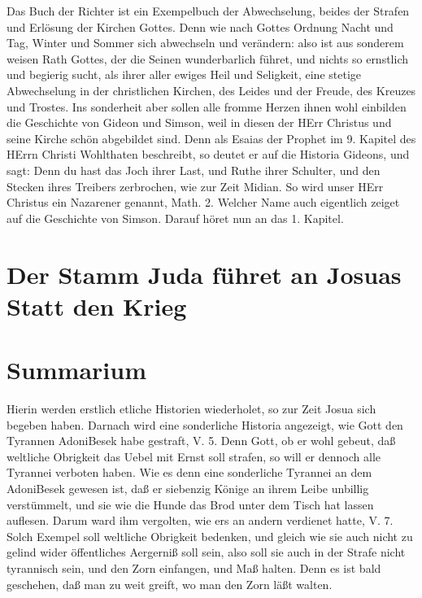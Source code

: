 Das Buch der Richter ist ein Exempelbuch der Abwechselung, beides der Strafen und Erlösung der Kirchen Gottes. Denn wie nach Gottes Ordnung Nacht und Tag, Winter und Sommer sich abwechseln und verändern: also ist aus sonderem weisen Rath Gottes, der die Seinen wunderbarlich führet, und nichts so ernstlich und begierig sucht, als ihrer aller ewiges Heil und Seligkeit, eine stetige Abwechselung in der christlichen Kirchen, des Leides und der Freude, des Kreuzes und Trostes. Ins sonderheit aber sollen alle fromme Herzen ihnen wohl einbilden die Geschichte von Gideon und Simson, weil in diesen der HErr Christus und seine Kirche schön abgebildet sind. Denn als Esaias der Prophet im 9. Kapitel des HErrn Christi Wohlthaten beschreibt, so deutet er auf die Historia Gideons, und sagt: Denn du hast das Joch ihrer Last, und Ruthe ihrer Schulter, und den Stecken ihres Treibers zerbrochen, wie zur Zeit Midian. So wird unser HErr Christus ein Nazarener genannt, Math. 2. Welcher Name auch eigentlich zeiget auf die Geschichte von Simson. Darauf höret nun an das 1. Kapitel.

\section{Der Stamm Juda führet an Josuas Statt den Krieg}
\section{Summarium}

Hierin werden erstlich etliche Historien wiederholet, so zur Zeit Josua sich begeben haben. Darnach wird eine sonderliche Historia angezeigt, wie Gott den Tyrannen AdoniBesek habe gestraft, V. 5. Denn Gott, ob er wohl gebeut, daß weltliche Obrigkeit das Uebel mit Ernst soll strafen, so will er dennoch alle Tyrannei verboten haben. Wie es denn eine sonderliche Tyrannei an dem AdoniBesek gewesen ist, daß er siebenzig Könige an ihrem Leibe unbillig verstümmelt, und sie wie die Hunde das Brod unter dem Tisch hat lassen auflesen. Darum ward ihm vergolten, wie ers an andern verdienet hatte, V. 7. Solch Exempel soll weltliche Obrigkeit bedenken, und gleich wie sie auch nicht zu gelind wider öffentliches Aergerniß soll sein, also soll sie auch in der Strafe nicht tyrannisch sein, und den Zorn einfangen, und Maß halten. Denn es ist bald geschehen, daß man zu weit greift, wo man den Zorn läßt walten.

